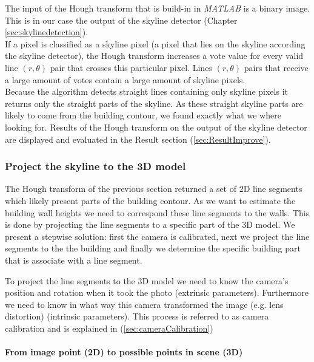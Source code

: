 	The input of the Hough transform that is build-in in \emph{MATLAB\cite{matlab}} is a binary
	image. This is in our case the output of the skyline detector (Chapter
	\ref{sec:skylinedetection}).\\
	If a pixel is classified as a skyline pixel (a pixel that lies on the
	skyline according the skyline detector), the Hough transform increases
	a vote value for every valid line $(r,\theta)$ pair that crosses this
	particular pixel.  
	Lines $(r,\theta)$ pairs that receive a large amount of votes
	contain a large amount of skyline pixels.\\
	Because the algorithm detects straight lines containing only skyline pixels
	it returns only the straight parts of the skyline.
	As these straight skyline parts are likely to come from the building
	contour, we found exactly what we where looking for.
	Results of the Hough transform on the output of the skyline detector are
	displayed and evaluated in the Result section (\ref{sec:ResultImprove}).

\subsubsection{Project the skyline to the 3D model}
\label{sec:project}

	The Hough transform of the previous section returned a set of 2D line
	segments which likely present parts of the building contour.  
	As we want to estimate the building wall heights we need to correspond these
	line segments to the walls.  This is done by projecting the line segments to a specific part of the 3D model.  
	We present a stepwise solution: first the camera is calibrated, next we
	project the line segments to the the building and finally we 
	determine the specific building part that is associate with a line segment.

	To project the line segments to the 3D model we need to know the
	camera's position and rotation when it took the photo (extrinsic
	parameters). Furthermore we need to know in what way this camera transformed
	the image (e.g. lens distortion) (intrinsic parameters).
	This process is referred to as camera calibration and is explained in 
	(\ref{sec:cameraCalibration})
	 
	\paragraph{From image point (2D) to possible points in scene (3D)} 

